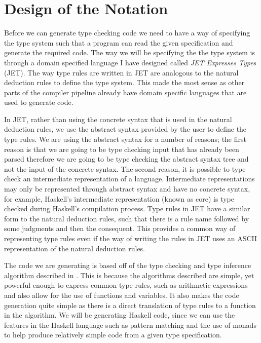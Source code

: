 \chapter{Design of the Notation}
\label{chap:Method}
Before we can generate type checking code we need to have a way of specifying the type system such that a program can read the given specification and generate the required code.
The way we will be specifying the the type system is through a domain specified language I have designed called \textit{JET Expresses Types} (JET).
The way type rules are written in JET are analogous to the natural deduction rules to define the type system.
This made the most sense as other parts of the compiler pipeline already have domain specific languages that are used to generate code.

In JET, rather than using the concrete syntax that is used in the natural deduction rules, we use the abstract syntax provided by the user to define the type rules.
We are using the abstract syntax for a number of reasons; the first reason is that we are going to be type checking input that has already been parsed therefore we are going to be type checking the abstract syntax tree and not the input of the concrete syntax.
The second reason, it is possible to type check an intermediate representation of a language.
Intermediate representations may only be represented through abstract syntax and have no concrete syntax, for example, Haskell's intermediate representation (known as core) is type checked during Haskell's compilation process\cite{marlow2004glasgow}.
Type rules in JET have a similar form to the natural deduction rules, such that there is a rule name followed by some judgments and then the consequent.
This provides a common way of representing type rules even if the way of writing the rules in JET uses an ASCII representation of the natural deduction rules.

The code we are generating is based off of the type checking and type inference algorithm described in \textcite{ranta2012implementing}.
This is because the algorithms described are simple, yet powerful enough to express common type rules, such as arithmetic expressions and also allow for the use of functions and variables.
It also makes the code generation quite simple as there is a direct translation of type rules to a function in the algorithm.
We will be generating Haskell code, since we can use the features in the Haskell language such as pattern matching and the use of monads to help produce relatively simple code from a given type specification.

